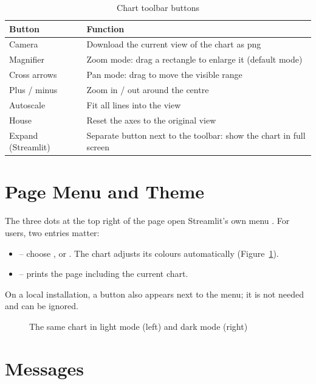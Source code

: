 \begin{table}[H]
\centering
\caption{Chart toolbar buttons}
\label{tab:uiToolbar}
\small
\begin{tabularx}{\linewidth}{@{}lX@{}}
\toprule
\textbf{Button} & \textbf{Function} \\
\midrule
Camera        & Download the current view of the chart as \ac{png} \\
Magnifier     & Zoom mode: drag a rectangle to enlarge it (default mode) \\
Cross arrows  & Pan mode: drag to move the visible range \\
Plus / minus  & Zoom in / out around the centre \\
Autoscale     & Fit all lines into the view \\
House         & Reset the axes to the original view \\
Expand (Streamlit) & Separate button next to the toolbar: show the chart in full screen \\
\bottomrule
\end{tabularx}
\end{table}

\section{Page Menu and Theme}
\label{sec:uiMenu}

The three dots  at the top right of the page open Streamlit's own menu \cite{Streamlit:2026}. For users, two entries matter:
\begin{itemize}
  \item {} -- choose ,  or . The chart adjusts its colours automatically (Figure~\ref{fig:uiThemes}).
  \item {} -- prints the page including the current chart.
\end{itemize}
On a local installation, a  button also appears next to the menu; it is not needed and can be ignored.

\begin{figure}[H]
  \centering
  \hfill
  \caption{The same chart in light mode (left) and dark mode (right)}
  \label{fig:uiThemes}
\end{figure}

\section{Messages}
\label{sec:uiMessages}

